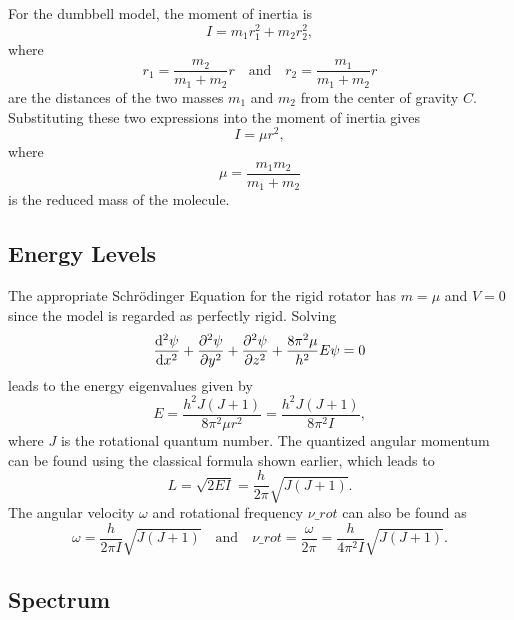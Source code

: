 For the dumbbell model, the moment of inertia is
\begin{equation*}
    I = m_1r_1^2 + m_2r_2^2,
\end{equation*}
where
\begin{equation*}
    r_1 = \frac{m_2}{m_1 + m_2}r \quad\text{and}\quad r_2 = \frac{m_1}{m_1 + m_2}r
\end{equation*}
are the distances of the two masses $m_1$ and $m_2$ from the center of gravity $C$. Substituting these two expressions into the moment of inertia gives
\begin{equation*}
    I = \mu r^2,
\end{equation*}
where
\begin{equation*}
    \mu = \frac{m_1m_2}{m_1 + m_2}
\end{equation*}
is the reduced mass of the molecule.

\subsection{Energy Levels}

The appropriate Schr\"odinger Equation for the rigid rotator has $m = \mu$ and $V = 0$ since the model is regarded as perfectly rigid. Solving
\begin{equation*}
    \odv[2]{\psi}{x} + \pdv[2]{\psi}{y} + \pdv[2]{\psi}{z} + \frac{8\pi^2\mu}{h^2}E\psi = 0
\end{equation*}
leads to the energy eigenvalues given by
\begin{equation*}
    E = \frac{h^2J(J + 1)}{8\pi^2\mu r^2} = \frac{h^2J(J + 1)}{8\pi^2I},
\end{equation*}
where $J$ is the rotational quantum number. The quantized angular momentum can be found using the classical formula shown earlier, which leads to
\begin{equation*}
    L = \sqrt{2EI} = \frac{h}{2\pi}\sqrt{J(J + 1)}.
\end{equation*}
The angular velocity $\omega$ and rotational frequency $\nu\_{rot}$ can also be found as
\begin{equation*}
    \omega = \frac{h}{2\pi I}\sqrt{J(J + 1)} \quad\text{and}\quad \nu\_{rot} = \frac{\omega}{2\pi} = \frac{h}{4\pi^2I}\sqrt{J(J + 1)}.
\end{equation*}

\subsection{Spectrum}

